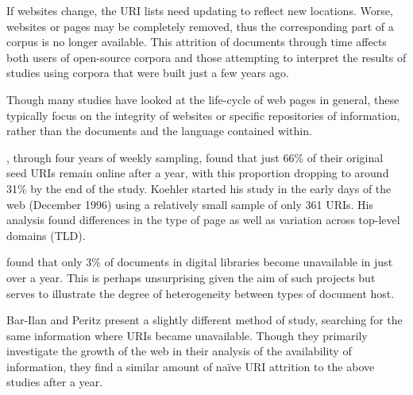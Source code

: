 If websites change, the URI lists need updating to reflect new locations. 
Worse, websites or pages may be completely removed, thus the corresponding part of a corpus is no longer available.
This attrition of documents through time affects both users of open-source corpora 
and those attempting to interpret the results of studies using corpora that were built just a few years ago.

Though many studies have looked at the life-cycle of web pages in general, these typically focus on the integrity of websites or specific repositories of information, rather than the documents and the language contained within.



\cite{koehler2002web}, through four years of weekly sampling, found that just 66\% of their original seed URIs remain online after a year, with this proportion dropping to around 31\% by the end of the study.  Koehler started his study in the early days of the web (December 1996) using a relatively small sample of only 361 URIs.  His analysis found differences in the type of page as well as variation across top-level domains (TLD). %

\cite{nelson2002object} found that only 3\% of documents in digital libraries become unavailable in just over a year. This is perhaps unsurprising given the aim of such projects but serves to illustrate the degree of heterogeneity between types of document host.  

Bar-Ilan and Peritz\cite{bar1999life} present a slightly different method of study, searching for the same information where URIs became unavailable.  Though they primarily investigate the growth of the web in their analysis of the availability of information, they find a similar amount of na\"{i}ve URI attrition to the above studies after a year.  




